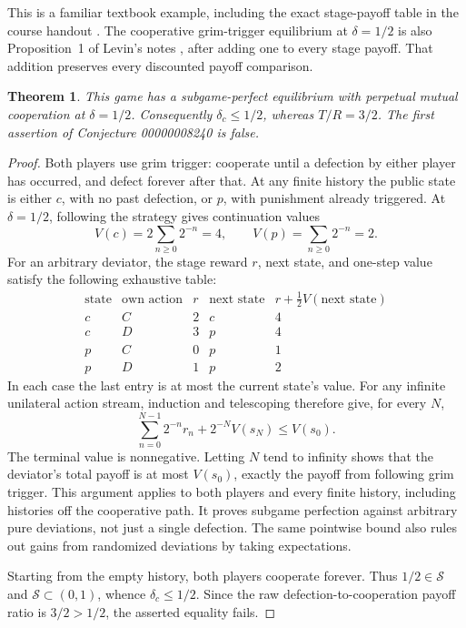 \documentclass[11pt]{article}
\newtheorem{theorem}{Theorem}
\begin{document}
This is a familiar textbook example, including the exact stage-payoff
table in the course handout \cite{osborne}. The cooperative
grim-trigger equilibrium at $\delta=1/2$ is also Proposition~1 of
Levin's notes \cite{levin}, after adding one to every stage payoff.
That addition preserves every discounted payoff comparison.

\begin{theorem}
This game has a subgame-perfect equilibrium with perpetual mutual
cooperation at $\delta=1/2$. Consequently $\delta_c\leq1/2$, whereas
$T/R=3/2$. The first assertion of Conjecture 00000008240 is false.
\end{theorem}
\begin{proof}
Both players use grim trigger: cooperate until a defection by either
player has occurred, and defect forever after that. At any finite
history the public state is either $c$, with no past defection, or
$p$, with punishment already triggered. At $\delta=1/2$, following
the strategy gives continuation values
\[
 V(c)=2\sum_{n\geq0}2^{-n}=4,
 \qquad V(p)=\sum_{n\geq0}2^{-n}=2.
\]
For an arbitrary deviator, the stage reward $r$, next state, and
one-step value satisfy the following exhaustive table:
\[
\begin{array}{c|c|c|c|c}
 \text{state}&\text{own action}&r&\text{next state}
     &r+\tfrac12 V(\text{next state})\\\hline
 c&C&2&c&4\\
 c&D&3&p&4\\
 p&C&0&p&1\\
 p&D&1&p&2
\end{array}
\]
In each case the last entry is at most the current state's value.
For any infinite unilateral action stream, induction and telescoping
therefore give, for every $N$,
\[
 \sum_{n=0}^{N-1}2^{-n}r_n+2^{-N}V(s_N)\leq V(s_0).
\]
The terminal value is nonnegative. Letting $N$ tend to infinity shows
that the deviator's total payoff is at most $V(s_0)$, exactly the
payoff from following grim trigger. This argument applies to both
players and every finite history, including histories off the
cooperative path. It proves subgame perfection against arbitrary
pure deviations, not just a single defection. The same pointwise
bound also rules out gains from randomized deviations by taking
expectations.

Starting from the empty history, both players cooperate forever.
Thus $1/2\in\mathcal S$ and $\mathcal S\subset(0,1)$, whence
$\delta_c\leq1/2$. Since the raw defection-to-cooperation payoff
ratio is $3/2>1/2$, the asserted equality fails.
\end{proof}
\end{document}
